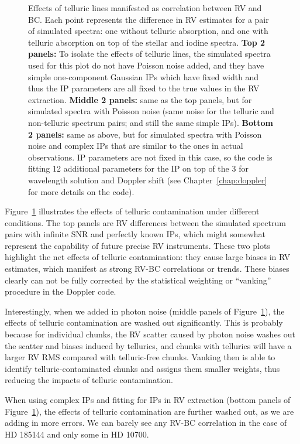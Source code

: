 \begin{figure}
\caption{Effects of telluric lines manifested as correlation between
  RV and BC. Each point represents the difference in RV estimates for
  a pair of simulated spectra: one without telluric absorption, and
  one with telluric absorption on top of the stellar and iodine
  spectra. {\bf Top 2 panels:} To isolate the effects of telluric
  lines, the simulated spectra used for this plot do not have Poisson
  noise added, and they have simple one-component Gaussian IPs which
  have fixed width and thus the IP parameters are all fixed to the
  true values in the RV extraction. {\bf Middle 2 panels:} same as the
  top panels, but for simulated spectra with Poisson noise (same noise
  for the telluric and non-telluric spectrum pairs; and still the same
  simple IPs). {\bf Bottom 2 panels:} same as above, but for simulated
  spectra with Poisson noise and complex IPs that are similar to the
  ones in actual observations. IP parameters are not fixed in this
  case, so the code is fitting 12 additional parameters for the IP on
  top of the 3 for wavelength solution and Doppler shift (see
  Chapter~\ref{chap:doppler} for more details on the code).
\label{telluric:fig:sim}}
\end{figure}

Figure~\ref{telluric:fig:sim} illustrates the effects of telluric
contamination under different conditions. The top panels are RV
differences between the simulated spectrum pairs with infinite SNR and
perfectly known IPs, which might somewhat represent the capability of
future precise RV instruments. These two plots highlight the net
effects of telluric contamination: they cause large biases in RV
estimates, which manifest as strong RV-BC correlations or
trends. These biases clearly can not be fully corrected by the
statistical weighting or ``vanking'' procedure in the Doppler code.

Interestingly, when we added in photon noise (middle panels of
Figure~\ref{telluric:fig:sim}), the effects of telluric contamination
are washed out significantly. This is probably because for individual
chunks, the RV scatter caused by photon noise washes out the scatter
and biases induced by tellurics, and chunks with tellurics will have a
larger RV RMS compared with telluric-free chunks. Vanking then is able
to identify telluric-contaminated chunks and assigns them smaller
weights, thus reducing the impacts of telluric contamination.

When using complex IPs and fitting for IPs in RV extraction (bottom
panels of Figure~\ref{telluric:fig:sim}), the effects of telluric
contamination are further washed out, as we are adding in more
errors. We can barely see any RV-BC correlation in the case of HD
185144 and only some in HD 10700.

